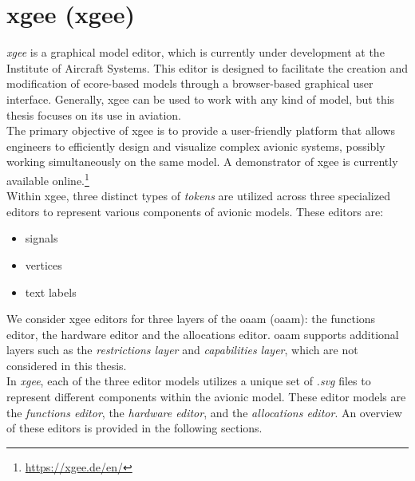 \section{\acrlong{xgee} (\acrshort{xgee})}
\label{sec:xgee}
\textit{\acrshort{xgee}} is a graphical model editor, which is currently under development at the Institute of Aircraft Systems. This editor is designed to facilitate the creation and modification of ecore-based models through a browser-based graphical user interface. Generally, \acrshort{xgee} can be used to work with any kind of model, but this thesis focuses on its use in aviation.\\
The primary objective of \acrshort{xgee} is to provide a user-friendly platform that allows engineers to efficiently design and visualize complex avionic systems, possibly working simultaneously on the same model. A demonstrator of \acrshort{xgee} is currently available online.\footnote{\url{https://xgee.de/en/}}\\
Within \acrshort{xgee}, three distinct types of \textit{tokens} are utilized across three specialized editors to represent various components of avionic models. These editors are:
\begin{itemize}
    \item signals
    \item vertices
    \item text labels
\end{itemize}
We consider \acrshort{xgee} editors for three layers of the \acrlong{oaam} (\acrshort{oaam}): the functions editor, the hardware editor and the allocations editor. \acrshort{oaam} supports additional layers such as the \textit{restrictions layer} and \textit{capabilities layer}, which are not considered in this thesis.\\
In \textit{\acrshort{xgee}}, each of the three editor models utilizes a unique set of \textit{.svg} files to represent different components within the avionic model. These editor models are the \textit{functions editor}, the \textit{hardware editor}, and the \textit{allocations editor}. An overview of these editors is provided in the following sections.

